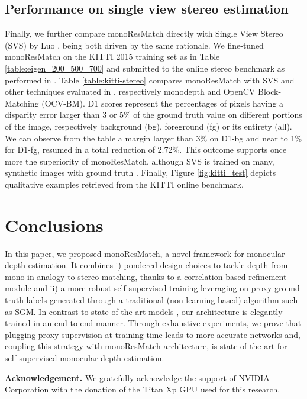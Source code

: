 \documentclass[10pt,twocolumn,letterpaper]{article}
\begin{document}
\subsection{Performance on single view stereo estimation}

Finally, we further compare monoResMatch directly with Single View Stereo (SVS) by Luo \etal \cite{luo2018single}, being both driven by the same rationale. We fine-tuned monoResMatch on the KITTI 2015 training set as in Table \ref{table:eigen_200_500_700} and submitted to the online stereo benchmark \cite{KITTI_2015} as performed in \cite{luo2018supervised}. Table \ref{table:kitti-stereo} compares monoResMatch with SVS and other techniques evaluated in \cite{luo2018supervised}, respectively monodepth \cite{monodepth17} and OpenCV Block-Matching (OCV-BM). D1 scores represent the percentages of pixels having a disparity error larger than 3 or 5\% of the ground truth value on different portions of the image, respectively background (bg), foreground (fg) or its entirety (all). We can observe from the table a margin larger than 3\% on D1-bg and near to 1\% for D1-fg, resumed in a total reduction of 2.72\%.
This outcome supports once more the superiority of monoResMatch, although SVS is trained on many, synthetic images with ground truth \cite{Mayer_2016_CVPR}. 
Finally, Figure \ref{fig:kitti_test} depicts qualitative examples retrieved from the KITTI online benchmark.



\section{Conclusions}

In this paper, we proposed monoResMatch, a novel framework for monocular depth estimation. It combines i) pondered design choices to tackle depth-from-mono in analogy to stereo matching, thanks to a correlation-based refinement module and ii) a more robust self-supervised training leveraging on proxy ground truth labels generated through a traditional  (\ie non-learning based) algorithm such as SGM. 
In contrast to state-of-the-art models \cite{luo2018single,guo2018learning,yang2018deep}, our architecture is elegantly trained in an end-to-end manner.
Through exhaustive experiments, we prove that plugging proxy-supervision at training time leads to more accurate networks and, coupling this strategy with monoResMatch architecture, is state-of-the-art for self-supervised monocular depth estimation.


\textbf{Acknowledgement.} We gratefully acknowledge the support of NVIDIA Corporation with the donation of the Titan Xp GPU used for this research.

{
\small


}
\end{document}
